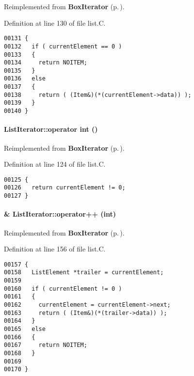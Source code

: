 Reimplemented from {\bf Box\-Iterator} {\rm (p.\,\pageref{BoxIterator_a3})}.

Definition at line 130 of file list.C.\small\begin{verbatim}00131 {
00132   if ( currentElement == 0 )
00133   {
00134     return NOITEM;
00135   }
00136   else
00137   {
00138     return ( (Item&)(*(currentElement->data)) );
00139   }
00140 }
\end{verbatim}\normalsize 
\label{ListIterator_a2}
\paragraph{\setlength{\rightskip}{0pt plus 5cm}List\-Iterator::operator int ()\hspace{0.3cm}{\tt  [virtual]}}\hfill



Reimplemented from {\bf Box\-Iterator} {\rm (p.\,\pageref{BoxIterator_a2})}.

Definition at line 124 of file list.C.\small\begin{verbatim}00125 {
00126   return currentElement != 0;
00127 }
\end{verbatim}\normalsize 
\label{ListIterator_a5}
\paragraph{ \& List\-Iterator::operator++ (int)\hspace{0.3cm}{\tt  [virtual]}}\hfill



Reimplemented from {\bf Box\-Iterator} {\rm (p.\,\pageref{BoxIterator_a5})}.

Definition at line 156 of file list.C.\small\begin{verbatim}00157 {
00158   ListElement *trailer = currentElement;
00159   
00160   if ( currentElement != 0 )
00161   {
00162     currentElement = currentElement->next;
00163     return ( (Item&)(*(trailer->data)) );
00164   }
00165   else 
00166   {
00167     return NOITEM;
00168   }
00169   
00170 }
\end{verbatim}\normalsize 
\label{ListIterator_a6}
